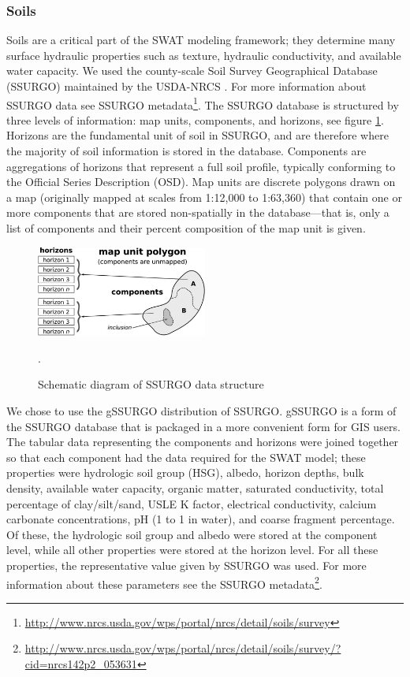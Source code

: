 \subsubsection{Soils}
Soils are a critical part of the SWAT modeling framework; they determine many
surface hydraulic properties such as texture, hydraulic conductivity, and
available water capacity. We used the county-scale Soil Survey Geographical
Database (SSURGO) maintained by the USDA-NRCS \citep{staff_gridded_2014}. For more information about SSURGO
data see SSURGO metadata\footnote{\url{http://www.nrcs.usda.gov/wps/portal/nrcs/detail/soils/survey}}.
The SSURGO database is structured by three levels of information: map units,
components, and horizons, see figure \ref{fig:ssurgo_schematic}. Horizons are the fundamental unit of soil in SSURGO, and are
therefore where the majority of soil information is stored in the database.
Components are aggregations of horizons that represent a full soil profile,
typically conforming to the Official Series Description (OSD). Map units
are discrete polygons drawn on a map (originally mapped at scales from 1:12,000
to 1:63,360) that contain one or more components that are stored non-spatially
in the database---that is, only a list of components and their percent
composition of the map unit is given. 

\begin{figure}[h]
  \centering
    \includegraphics[width=0.5\textwidth]{./img/ssurgo_data_structure_schematic.jpeg}
	\caption[Schematic diagram of SSURGO data structure]{Schematic diagram of SSURGO data structure \cite{gatzke_aggregation_2011}}.
	\label{fig:ssurgo_schematic}
\end{figure}

We chose to use the gSSURGO distribution of SSURGO. gSSURGO is a form of the SSURGO database that is packaged in a more
convenient form for GIS users. The tabular data representing the components and
horizons were joined together so that each component had the data required for
the SWAT model; these properties were hydrologic soil group (HSG), albedo,
horizon depths, bulk density, available water capacity, organic matter,
saturated conductivity, total percentage of clay/silt/sand, USLE K factor,
electrical conductivity, calcium carbonate concentrations, pH (1 to 1 in water),
and coarse fragment percentage. Of these, the hydrologic soil group and albedo
were stored at the component level, while all other properties were stored at
the horizon level. For all these properties, the representative value given by
SSURGO was used. For more information about these parameters see the SSURGO
metadata\footnote{\url{http://www.nrcs.usda.gov/wps/portal/nrcs/detail/soils/survey/?cid=nrcs142p2_053631}}.

